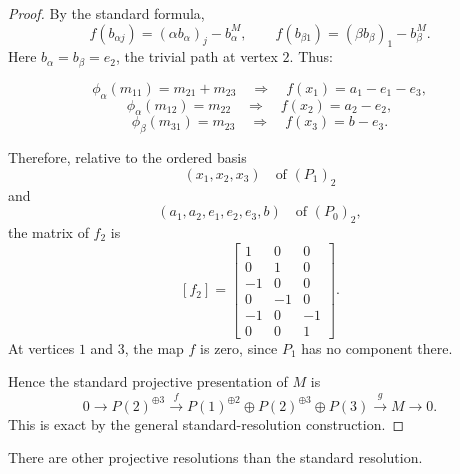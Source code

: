 \documentclass[11pt, a4paper]{report}
\begin{document}
\begin{example}
\begin{proof}
By the standard formula,
\[
f(b_{\alpha j})=(\alpha b_\alpha)_j-b_\alpha^M,
\qquad
f(b_{\beta 1})=(\beta b_\beta)_1-b_\beta^M.
\]
Here \(b_\alpha=b_\beta=e_2\), the trivial path at vertex \(2\). Thus:

\[
\phi_\alpha(m_{11})=m_{21}+m_{23}
\quad\Longrightarrow\quad
f(x_1)=a_1-e_1-e_3,
\]
\[
\phi_\alpha(m_{12})=m_{22}
\quad\Longrightarrow\quad
f(x_2)=a_2-e_2,
\]
\[
\phi_\beta(m_{31})=m_{23}
\quad\Longrightarrow\quad
f(x_3)=b-e_3.
\]

Therefore, relative to the ordered basis
\[
(x_1,x_2,x_3)
\quad\text{of }(P_1)_2
\]
and
\[
(a_1,a_2,e_1,e_2,e_3,b)
\quad\text{of }(P_0)_2,
\]
the matrix of \(f_2\) is
\[
[f_2]=
\begin{bmatrix}
 1& 0& 0\\
 0& 1& 0\\
-1& 0& 0\\
 0&-1& 0\\
-1& 0&-1\\
 0& 0& 1
\end{bmatrix}.
\]
At vertices \(1\) and \(3\), the map \(f\) is zero, since \(P_1\) has no component there.

Hence the standard projective presentation of \(M\) is
\[
0\longrightarrow P(2)^{\oplus 3}
\xrightarrow{\,f\,}
P(1)^{\oplus 2}\oplus P(2)^{\oplus 3}\oplus P(3)
\xrightarrow{\,g\,}
M
\longrightarrow 0.
\]
This is exact by the general standard-resolution construction.
\end{proof}
\end{example}

\begin{remark}
    There are other projective resolutions than the standard resolution.
    \end{remark}
\end{document}
